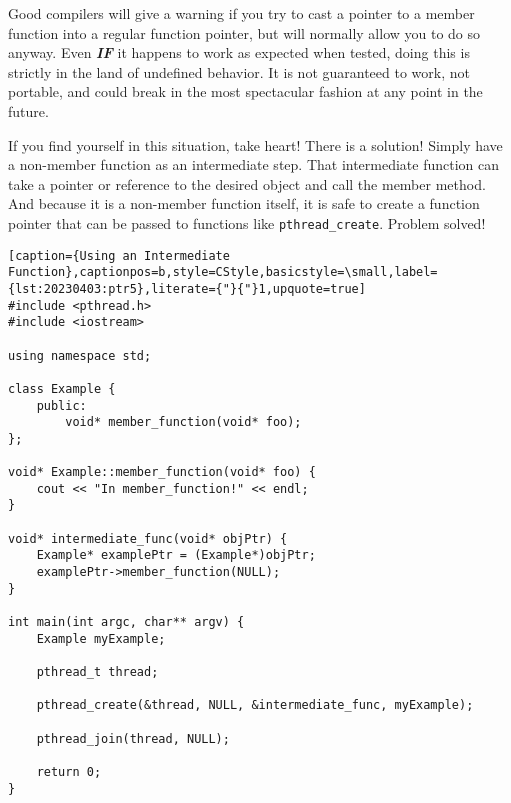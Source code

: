 Good compilers will give a warning if you try to cast a pointer to a member function into a regular function pointer, but will normally allow you to do so anyway. Even \textbf{\textit{IF}} it happens to work as expected when tested, doing this is strictly in the land of undefined behavior. It is not guaranteed to work, not portable, and could break in the most spectacular fashion at any point in the future.

If you find yourself in this situation, take heart! There is a solution! Simply have a non-member function as an intermediate step. That intermediate function can take a pointer or reference to the desired object and call the member method. And because it is a non-member function itself, it is safe to create a function pointer that can be passed to functions like \texttt{pthread\_create}. Problem solved!

\begin{lstlisting}[caption={Using an Intermediate Function},captionpos=b,style=CStyle,basicstyle=\small,label={lst:20230403:ptr5},literate={"}{"}1,upquote=true]
#include <pthread.h>
#include <iostream>

using namespace std;

class Example {
	public:
		void* member_function(void* foo);
};

void* Example::member_function(void* foo) {
	cout << "In member_function!" << endl;
}

void* intermediate_func(void* objPtr) {
	Example* examplePtr = (Example*)objPtr;
	examplePtr->member_function(NULL);
}

int main(int argc, char** argv) {
	Example myExample;

	pthread_t thread;

	pthread_create(&thread, NULL, &intermediate_func, myExample);

	pthread_join(thread, NULL);

	return 0;
}
\end{lstlisting}
